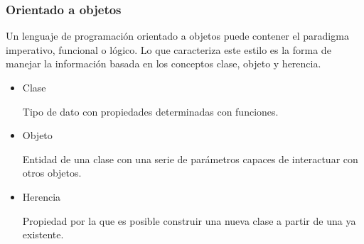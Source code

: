 \subsubsection*{Orientado a objetos}
Un lenguaje de programación orientado a objetos puede contener el paradigma imperativo, funcional o lógico. Lo que caracteriza este estilo es la forma de manejar la información basada en los conceptos clase, objeto y herencia.
\begin{itemize}
      \item Clase

            Tipo de dato con propiedades determinadas con funciones.
      \item Objeto

            Entidad de una clase con una serie de parámetros capaces de interactuar con otros objetos.
      \item Herencia

            Propiedad por la que es posible construir una nueva clase a partir de una ya existente.
\end{itemize}